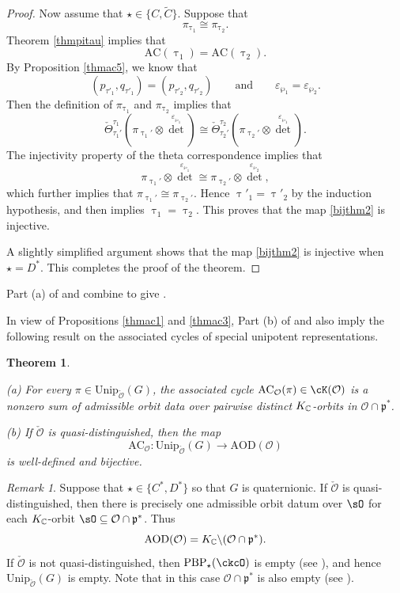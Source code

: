\documentclass[11pt,a4paper]{amsart}
\newcommand{\CO}{{\mathcal {O}}}
\newcommand{\p}{\mathfrak p}
\numberwithin{equation}{section}
\newtheorem{thm}{Theorem}[section]
\theoremstyle{remark}
\newtheorem*{remark}{Remark}
\def\subset{\subseteq}
\def\PBP{\mathrm{PBP}}
\begin{document}
\begin{proof}
Now assume that $\star\in \{C,\widetilde C\}$. Suppose that
\[
  \pi_{\uptau_1}\cong \pi_{\uptau_2}.
\]
Theorem \ref{thmpitau} implies that
\[
\mathrm{AC}(\uptau_1)=\mathrm{AC}(\uptau_2).
\]
By Proposition \ref{thmac5}, we know that
\[
 ( p_{\tau'_1}, q_{\tau'_1})=( p_{\tau'_2}, q_{\tau'_2})\qquad\textrm{and}\qquad \varepsilon_{\wp_1}=\varepsilon_{\wp_2}.
\]
Then the definition of $ \pi_{\uptau_1}$ and $ \pi_{\uptau_2}$ implies that
\[
  \check \Theta_{\tau_1'}^{\tau_1}(\pi_{\uptau_1'}\otimes {\det}^{\varepsilon_{\wp_1}})\cong \check \Theta_{\tau_2'}^{\tau_2}(\pi_{\uptau_2'}\otimes {\det}^{\varepsilon_{\wp_1}}).
\]
The injectivity property of the theta correspondence implies that
\[
\pi_{\uptau_1'}\otimes {\det}^{\varepsilon_{\wp_1}}\cong \pi_{\uptau_2'}\otimes {\det}^{\varepsilon_{\wp_2}},
\]
which further implies that $\pi_{\uptau_1'}\cong \pi_{\uptau_2'}$.
Hence $\uptau'_1=\uptau'_2$ by the induction hypothesis, and  then implies $\uptau_1=\uptau_2$. This proves that the map \eqref{bijthm2} is injective.

A slightly simplified argument shows that the map \eqref{bijthm2} is injective when $\star=D^*$. This completes the proof of the theorem.
\end{proof}

Part (a) of  and  combine to give
. 


In view of Propositions \ref{thmac1} and \ref{thmac3}, 
Part (b) of   and  also imply the following result on the associated cycles of special unipotent representations. 


\begin{thm}\label{thmac0} 

\noindent (a) For every $\pi\in \mathrm{Unip}_{\check \CO}(G)$, the associated cycle $\mathrm{AC}_{\CO}(\pi)\in \cK(\CO) $ is a nonzero  sum of  admissible orbit data
over pairwise distinct $K_{\mathbb{C}}$-orbits in $\CO\cap \p^*$. 

\noindent  (b) If $\check \CO$ is quasi-distinguished, then the map %
\[
\mathrm{AC}_{\CO}: \mathrm{Unip}_{\check \CO}(G)\rightarrow  \mathrm{AOD}(\CO)
\]
is well-defined and bijective. 
\end{thm}

\begin{remark}
Suppose that $\star\in \{C^*, D^*\}$ so that $G$ is quaternionic.
If $\check \CO$ is quasi-distinguished, then there is precisely one admissible orbit datum over  $\sO$ for each $K_{\mathbb{C}}$-orbit $\sO\subset \CO\cap \p^*$.
Thus
\[
 \mathrm{AOD}(\CO)=K_\C\backslash  (\CO\cap \p^*).
\]
If $\check \CO$ is not quasi-distinguished, then
$\PBP_\star(\ckcO)$ is empty (see ), and 
hence $\mathrm{Unip}_{\check \CO}(G)$ is empty. Note that in this case $\CO\cap \p^*$ is also empty (see \cite[Theorems 9.3.4 and 9.3.5]{CM}). 

\end{remark}
\end{document}

